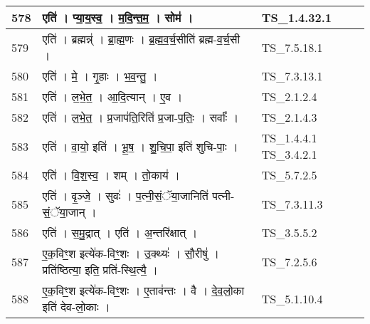 \documentclass[17pt]{extarticle}
\begin{document}
\begin{longtable}{||p{0.4in}||p{4.9in}||p{0.9in}||}
    \hline
        
    578 & एति॑   ।   प्या॒य॒स्व॒   ।   म॒दि॒न्त॒म॒   ।   सोम॑   ।    & TS\_1.4.32.1       \\
    
    \hline
        
    579 & एति॑   ।   ब्रह्मन्न्॑   ।   ब्रा॒ह्म॒णः   ।   ब्र॒ह्म॒व॒र्च॒सीति॑ ब्रह्म{-}व॒र्च॒सी   ।    & TS\_7.5.18.1       \\
    
    \hline
        
    580 & एति॑   ।   मे॒   ।   गृ॒हाः   ।   भ॒व॒न्तु॒   ।    & TS\_7.3.13.1       \\
    
    \hline
        
    581 & एति॑   ।   ल॒भे॒त॒   ।   आ॒दि॒त्यान्   ।   ए॒व   ।    & TS\_2.1.2.4       \\
    
    \hline
        
    582 & एति॑   ।   ल॒भे॒त॒   ।   प्र॒जाप॑ति॒रिति॑ प्र॒जा{-}प॒तिः॒   ।   सर्वाः᳚   ।    & TS\_2.1.4.3       \\
    
    \hline
        
    583 & एति॑   ।   वा॒यो॒ इति॑   ।   भू॒ष॒   ।   शु॒चि॒पा॒ इति॑ शुचि{-}पाः॒   ।    & TS\_1.4.4.1 TS\_3.4.2.1       \\
    
    \hline
        
    584 & एति॑   ।   वि॒श॒स्व॒   ।   शम्   ।   तो॒काय॑   ।    & TS\_5.7.2.5       \\
    
    \hline
        
    585 & एति॑   ।   वृ॒ञ्जे॒   ।   सुवः॑   ।   प॒त्नी॒सं॒ॅया॒जानिति॑ पत्नी{-}सं॒ॅया॒जान्   ।    & TS\_7.3.11.3       \\
    
    \hline
        
    586 & एति॑   ।   स॒मु॒द्रात्   ।   एति॑   ।   अ॒न्तरि॑क्षात्   ।    & TS\_3.5.5.2       \\
    
    \hline
        
    587 & ए॒क॒विꣳ॒॒श इत्ये॑क{-}विꣳ॒॒शः   ।   उ॒क्थ्यः॑   ।   सौ॒रीषु॑   ।   प्रति॑ष्ठित्या॒ इति॒ प्रति॑{-}स्थि॒त्यै॒   ।    & TS\_7.2.5.6       \\
    
    \hline
        
    588 & ए॒क॒विꣳ॒॒श इत्ये॑क{-}विꣳ॒॒शः   ।   ए॒ताव॑न्तः   ।   वै   ।   दे॒व॒लो॒का इति॑ देव{-}लो॒काः   ।    & TS\_5.1.10.4       \\
    

\end{longtable}
\end{document}
